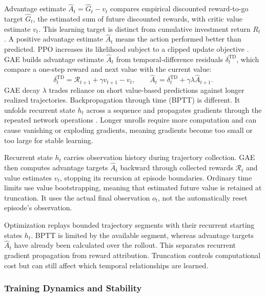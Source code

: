 Advantage estimate \(\hat A_t=\hat G_t-v_t\) compares empirical discounted reward-to-go target \(\hat G_t\), the estimated sum of future discounted rewards, with critic value estimate \(v_t\). This learning target is distinct from cumulative investment return \(R_t\). A positive advantage estimate \(\hat A_t\) means the action performed better than predicted. PPO increases its likelihood subject to a clipped update objective \cite{JohnSchulmanFilipWolskiPrafullaDhariwalAlecRadfordOlegKlimov.2017}. GAE builds advantage estimate \(\hat A_t\) from temporal-difference residuals \(\delta_t^{\mathrm{TD}}\), which compare a one-step reward and next value with the current value:
\begin{equation}
\delta_t^{\mathrm{TD}}=\mathcal R_{t+1}+\gamma v_{t+1}-v_t,\qquad
\hat A_t=\delta_t^{\mathrm{TD}}+\gamma\lambda\hat A_{t+1}.
\label{eq:gae}
\end{equation}
GAE decay \(\lambda\) trades reliance on short value-based predictions against longer realized trajectories. Backpropagation through time (BPTT) is different. It unfolds recurrent state \(h_t\) across a sequence and propagates gradients through the repeated network operations \cite[Chapter~10]{Goodfellow-et-al-2016}. Longer unrolls require more computation and can cause vanishing or exploding gradients, meaning gradients become too small or too large for stable learning.

Recurrent state \(h_t\) carries observation history during trajectory collection. GAE then computes advantage targets \(\hat A_t\) backward through collected rewards \(\mathcal R_t\) and value estimates \(v_t\), stopping its recursion at episode boundaries. Ordinary time limits use value bootstrapping, meaning that estimated future value is retained at truncation. It uses the actual final observation \(o_t\), not the automatically reset episode's observation.

Optimization replays bounded trajectory segments with their recurrent starting states \(h_t\). BPTT is limited by the available segment, whereas advantage targets \(\hat A_t\) have already been calculated over the rollout. This separates recurrent gradient propagation from reward attribution. Truncation controls computational cost but can still affect which temporal relationships are learned.

\subsubsection{Training Dynamics and Stability}
\label{sec:saa-stability}

